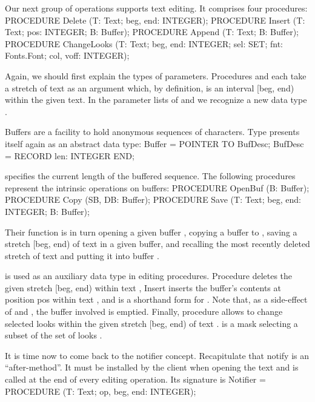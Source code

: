 Our next group of operations supports text editing. It comprises four procedures:
\begintt
PROCEDURE Delete (T: Text; beg, end: INTEGER);
PROCEDURE Insert (T: Text; pos: INTEGER; B: Buffer);
PROCEDURE Append (T: Text; B: Buffer);
PROCEDURE ChangeLooks (T: Text; beg, end: INTEGER; sel: SET; fnt: Fonts.Font; col, voff: INTEGER);
\endtt

\noindent Again, we should first explain the types of parameters. Procedures
 and  each take a stretch of text as an argument
which, by definition, is an interval [beg, end) within the given
text. In the parameter lists of  and  we recognize a new
data type .

Buffers are a facility to hold anonymous sequences of characters. Type
 presents itself again as an abstract data type:
\begintt  
Buffer = POINTER TO BufDesc;
BufDesc = RECORD
  len: INTEGER
END;
\endtt

\noindent {} specifies the current length of the buffered sequence. The
following procedures represent the intrinsic operations on buffers:
\begintt
PROCEDURE OpenBuf (B: Buffer);
PROCEDURE Copy (SB, DB: Buffer);
PROCEDURE Save (T: Text; beg, end: INTEGER; B: Buffer);
\endtt

\noindent Their function is in turn opening a given buffer , copying a buffer
 to , saving a stretch [beg, end) of text in a given buffer, and
recalling the most recently deleted stretch of text and putting it
into buffer .

 is used as an auxiliary data type in editing
procedures. Procedure  deletes the given stretch [beg, end)
within text , Insert inserts the buffer's contents at position pos
within text , and  is a shorthand form for . Note that, as a side-effect of  and , the
buffer involved is emptied. Finally, procedure  allows to
change selected looks within the given stretch [beg, end) of text
.  is a mask selecting a subset of the set of looks .

It is time now to come back to the notifier concept. Recapitulate that
notify is an ``after-method''. It must be installed by the client when
opening the text and is called at the end of every editing
operation. Its signature is
\begintt
Notifier = PROCEDURE (T: Text; op, beg, end: INTEGER);
\endtt

